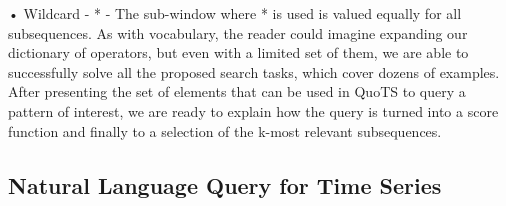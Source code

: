 •	Wildcard - * - The sub-window where * is used is valued equally for all subsequences.
As with vocabulary, the reader could imagine expanding our dictionary of operators, but even with a limited set of them, we are able to successfully solve all the proposed search tasks, which cover dozens of examples. 
After presenting the set of elements that can be used in QuoTS to query a pattern of interest, we are ready to explain how the query is turned into a score function and finally to a selection of the k-most relevant subsequences. 



\subsection{Natural Language Query for Time Series}


